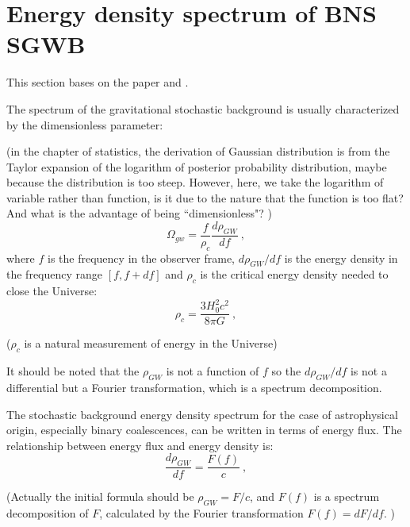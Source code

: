 \documentclass[11pt, a4paper]{article}
\begin{document}
\section{Energy density spectrum of BNS SGWB} \label{sec:energy}
\quad

This section bases on the paper\cite{Regimbau2008} and \cite{Wu2012}.

The spectrum of the gravitational stochastic background is usually characterized by the dimensionless parameter:

 (in the chapter of statistics, the derivation of Gaussian distribution is from the Taylor expansion of the logarithm of posterior probability distribution, maybe because the distribution is too steep. However, here, we take the logarithm of variable rather than function, is it due to the nature that the function is too flat? And what is the advantage of being ``dimensionless"? )
\begin{equation}
\Omega_{gw}=\frac{f}{\rho_c} \frac{d\rho_{GW}}{df}~,
\end{equation}
where $f$ is the frequency in the observer frame, $d\rho_{GW}/df$ is the energy density in the frequency range $[f,f+df]$ and $\rho_c$ is the critical energy density needed to close the Universe:
\begin{equation}
\rho_c=\frac{3H_0^2c^2}{8\pi G}~,
\end{equation}

($\rho_c$ is a natural measurement of energy in the Universe)

It should be noted that  the $\rho_{GW}$ is not a function of $f$ so the ${d\rho_{GW}}/{df}$ is not a differential but a Fourier transformation, which is a spectrum decomposition. 

The stochastic background energy density spectrum for the case of astrophysical origin, especially binary coalescences, can be written in terms of energy flux. The relationship between energy flux and energy density is:
\begin{equation}
\frac{d\rho_{GW}}{df}=\frac{F(f)}{c}~,
\end{equation}

(Actually the initial formula should be $\rho_{GW}=F/c$, and $F(f)$ is a spectrum decomposition of $F$, calculated by the Fourier transformation $F(f)=dF/df$. ) 
\end{document}
